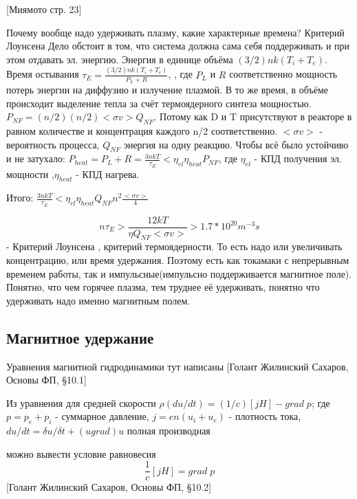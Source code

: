\documentclass[10pt, a4paper]{article}
\numberwithin{equation}{section}
\begin{document}
[Миямото стр. 23]

Почему вообще надо удерживать плазму, какие характерные времена? Критерий Лоунсена 
Дело обстоит в том, что система должна сама себя поддерживать и при этом отдавать эл. энергию. Энергия в единице объёма $(3/2)nk(T_i+T_e)$. Время остывания $\tau_E = \frac { (3/2)nk(T_i+T_e) }{P_L+R}$, , где $P_L$ и $R$ соответственно мощность потерь энергии на диффузию и излучение плазмой. В то же время, в объёме происходит выделение тепла за счёт термоядерного синтеза мощностью. $P_{NF}=(n/2)(n/2)<\sigma v> Q_{NF} $. Потому
 как D и T присутствуют в реакторе в равном количестве и концентрация каждого n/2 соответственно. $<\sigma v> $ - вероятность процесса,   $Q_{NF} $ энергия на одну реакцию.
Чтобы всё было устойчиво и не затухало: $P_{heat}=P_L + R = \frac{3nkT}{\tau_E} < \eta_{el} \eta_{heat} P_{NF} $, где $\eta_{el} $ - КПД получения эл. мощности ,$ \eta_{heat} $ - КПД нагрева.

Итого: $ \frac{3nkT}{\tau_E} < \eta_{el} \eta_{heat} Q_{NF} n^{2} \frac{<\sigma v>}{4}$

\begin{equation}
	\label{eq.Disp14.1.1}
	n \tau_E > \frac{12 kT}{\eta Q_{NF} <\sigma v>} > 1.7*10^{20} m^{-3} s
\end{equation}
 - Критерий Лоунсена , критерий термоядерности. То есть надо или увеличивать концентрацию, или время удержания. Поэтому есть как токамаки с непрерывным временем работы, так и импульсные(импульсно поддерживается магнитное поле).
Понятно, что чем горячее плазма, тем труднее её удерживать, понятно что удерживать надо именно магнитным полем.

\subsection{Магнитное удержание}
\label{14.1}

Уравнения магнитной гидродинамики тут написаны [Голант Жилинский Сахаров, Основы ФП,  §10.1]

Из уравнения для средней скорости $\rho (du/dt)=(1/c)[j H]-grad\;p$; где $p=p_e+p_i$ - суммарное давление, $j=en(u_i+u_e)$ - плотность тока, $ du/dt=\delta u / \delta t + (u grad)u$ полная производная

можно вывести условие равновесия
\begin{equation}
	\label{eq.Disp14.1.2}
	\frac{1}{c}[j H]=grad\;p
\end{equation}
[Голант Жилинский Сахаров, Основы ФП,  §10.2]
\end{document}
